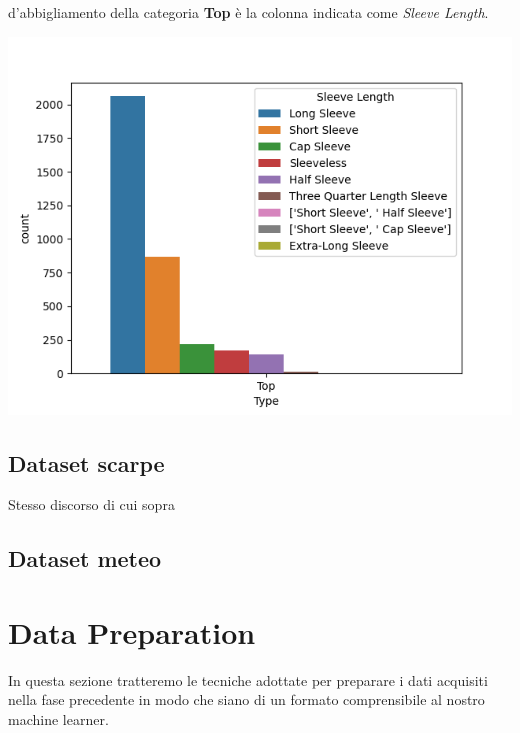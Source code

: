 \documentclass[a4paper, 11pt, oneside]{report}
\begin{document}
                d'abbigliamento della categoria \textbf{Top} è la colonna indicata come \textit{Sleeve Length}.
                \begin{center}
                    \includegraphics[scale=0.4]{countLengthTop}
                \end{center}
                \subsection{Dataset scarpe}
                Stesso discorso di cui sopra
                \subsection{Dataset meteo}

            \newpage
            \section{Data Preparation}
            In questa sezione tratteremo le tecniche adottate per preparare i dati acquisiti nella fase precedente in
            modo che siano di un formato comprensibile al nostro machine learner.
\end{document}
